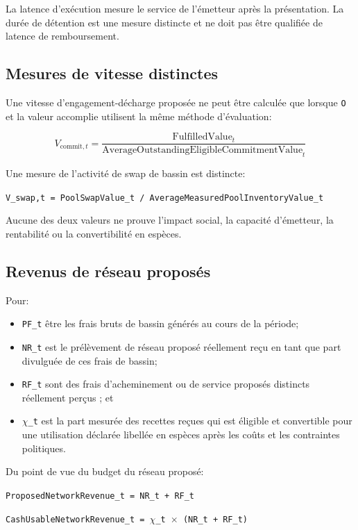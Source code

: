 \documentclass[11pt]{article}
\begin{document}
La latence d'exécution mesure le service de l'émetteur après la présentation. La durée de détention est une mesure distincte et ne doit pas être qualifiée de latence de remboursement.

\subsection*{Mesures de vitesse distinctes}

Une vitesse d'engagement-décharge proposée ne peut être calculée que lorsque \texttt{O} et la valeur accomplie utilisent la même méthode d'évaluation:

\[
V_{\mathrm{commit},t} = \frac{\mathrm{FulfilledValue}_t}{\mathrm{AverageOutstandingEligibleCommitmentValue}_t}
\]

Une mesure de l'activité de swap de bassin est distincte:

\texttt{V\_swap,t = PoolSwapValue\_t / AverageMeasuredPoolInventoryValue\_t}

Aucune des deux valeurs ne prouve l'impact social, la capacité d'émetteur, la rentabilité ou la convertibilité en espèces.

\subsection*{Revenus de réseau proposés}

Pour:

\begin{itemize}[leftmargin=*]
\item \texttt{PF\_t} être les frais bruts de bassin générés au cours de la période;
\item \texttt{NR\_t} est le prélèvement de réseau proposé réellement reçu en tant que part divulguée de ces frais de bassin;
\item \texttt{RF\_t} sont des frais d'acheminement ou de service proposés distincts réellement perçus ; et
\item \texttt{$\chi$\_t} est la part mesurée des recettes reçues qui est éligible et convertible pour une utilisation déclarée libellée en espèces après les coûts et les contraintes politiques.
\end{itemize}
Du point de vue du budget du réseau proposé:

\texttt{ProposedNetworkRevenue\_t = NR\_t + RF\_t}

\texttt{CashUsableNetworkRevenue\_t = $\chi$\_t $\times$ (NR\_t + RF\_t)}
\end{document}
